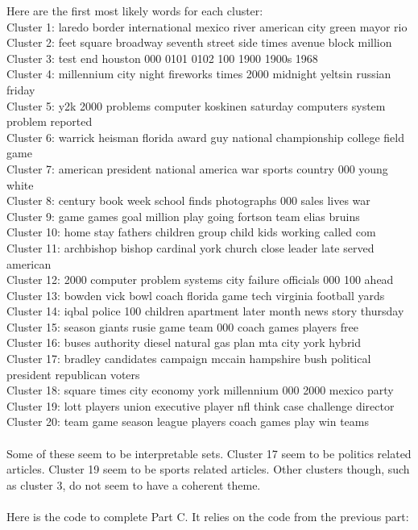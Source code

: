 \documentclass[twoside,11pt]{article}
\theoremstyle{definition}
\begin{document}
Here are the first most likely words for each cluster:\\
Cluster 1: laredo border international mexico river american city green mayor rio \\
Cluster 2: feet square broadway seventh street side times avenue block million \\
Cluster 3: test end houston 000 0101 0102 100 1900 1900s 1968 \\
Cluster 4: millennium city night fireworks times 2000 midnight yeltsin russian friday \\
Cluster 5: y2k 2000 problems computer koskinen saturday computers system problem reported \\
Cluster 6: warrick heisman florida award guy national championship college field game \\
Cluster 7: american president national america war sports country 000 young white \\
Cluster 8: century book week school finds photographs 000 sales lives war \\
Cluster 9: game games goal million play going fortson team elias bruins \\
Cluster 10: home stay fathers children group child kids working called com\\ 
Cluster 11: archbishop bishop cardinal york church close leader late served american \\
Cluster 12: 2000 computer problem systems city failure officials 000 100 ahead \\
Cluster 13: bowden vick bowl coach florida game tech virginia football yards \\
Cluster 14: iqbal police 100 children apartment later month news story thursday\\ 
Cluster 15: season giants rusie game team 000 coach games players free \\
Cluster 16: buses authority diesel natural gas plan mta city york hybrid \\
Cluster 17: bradley candidates campaign mccain hampshire bush political president republican voters \\
Cluster 18: square times city economy york millennium 000 2000 mexico party \\
Cluster 19: lott players union executive player nfl think case challenge director \\
Cluster 20: team game season league players coach games play win teams \\
\\
Some of these seem to be interpretable sets. Cluster 17 seem to be politics related articles. Cluster 19 seem to be sports related articles. Other clusters though, such as cluster 3, do not seem to have a coherent theme. \\
\\
Here is the code to complete Part C. It relies on the code from the previous part: \\

\end{document}
